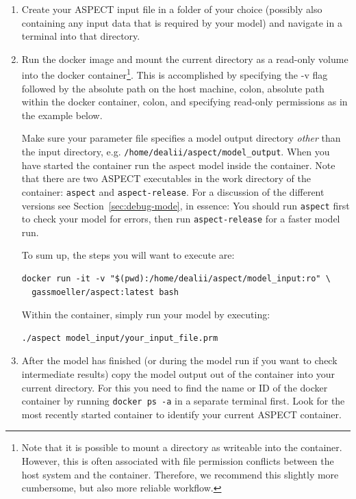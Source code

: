 \documentclass{article}
\newcommand{\aspect}{\textsc{ASPECT}}
\begin{document}
\begin{enumerate}
\item Create your \aspect{} input file in a folder of your choice (possibly
also containing any input data that is required by your model) and navigate in a
terminal into that directory.
\item Run the docker image and mount the current directory as a read-only
volume into the docker container\footnote{Note that it is possible to mount a
directory as writeable into the container. However, this is often associated
with file permission conflicts between the host system and the container.
Therefore, we recommend this slightly more cumbersome, but also more reliable
workflow.}. This is accomplished by specifying the -v flag followed by
the absolute path on the host machine, colon, absolute path within the docker
container, colon, and specifying read-only permissions as in the example below.

Make sure your parameter file specifies a model output directory \textit{other}
than the input directory, e.g. \texttt{/home/dealii/aspect/model\_output}. When
you have started the container run the aspect model inside the container. Note
that there are two \aspect{} executables in the work directory of the container:
\texttt{aspect} and \texttt{aspect-release}. For a discussion of the
different versions see Section~\ref{sec:debug-mode}, in essence: You should run
\texttt{aspect} first to check your model for errors, then run
\texttt{aspect-release} for a faster model run.

To sum up, the steps you will want to execute are:
\begin{lstlisting}[frame=single,language=ksh,showstringspaces=false]
docker run -it -v "$(pwd):/home/dealii/aspect/model_input:ro" \
  gassmoeller/aspect:latest bash
\end{lstlisting}

Within the container, simply run your model by executing:

\begin{lstlisting}[frame=single,language=ksh]
./aspect model_input/your_input_file.prm
\end{lstlisting}

\item After the model has finished (or during the model run if you want to check
intermediate results) copy the model output out of the container into your
current directory. For this you need to find the name or ID of the docker
container by running \texttt{docker ps -a} in a separate terminal first. Look
for the most recently started container to identify your current \aspect{}
container.


\end{enumerate}
\end{document}
